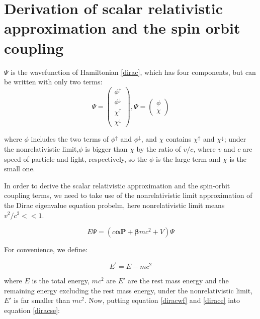 \documentclass[a4paper]{report}
\begin{document}
\section{Derivation of scalar relativistic approximation and the spin orbit coupling}

\noindent  $\Psi$ is the wavefunction of Hamiltonian \ref{dirac}, which has four components, but can be 
written with only two terms:
\begin{equation}\label{diracwf}
\Psi= \left( \begin{array}{c}
\phi^{\uparrow} \\
\phi^{\downarrow} \\
\chi^{\uparrow} \\
\chi^{\downarrow} \end{array} \right),
 \Psi = \left(\begin{array}{c}
\phi \\               
\chi \end{array} \right)
\end{equation}


\noindent where $\phi$ includes the two terms of $\phi^{\uparrow}$ and $\phi^{\downarrow}$, and $\chi$ contains  $\chi^{\uparrow}$ and $\chi^{\downarrow}$;
under the nonrelativistic limit,$\phi$ is bigger than $\chi$ by the ratio of $v/c$, where $v$ and $c$ are speed of particle and light, respectively,
so the $\phi$ is the large term and $\chi$ is the small one.

\noindent In order to derive the scalar relativistic approximation and the spin-orbit coupling terms, we need to take use of the nonrelativistic limit approximation of the 
Dirac eigenvalue equation probelm, here nonrelativistic limit means $v^2/c^2 << 1$.

\begin{equation}\label{diracse}
 E \Psi = (c \boldsymbol{\alpha} \textbf{P} + \boldsymbol{\beta}mc^{2} + V) \Psi
\end{equation}

\noindent For convenience, we define:

\begin{equation}\label{dirace}
E^{\prime} = E - mc^2
\end{equation}

\noindent where $E$ is the total energy, $mc^2$ are $E'$ are the rest mass energy and the remaining energy excluding the rest mass energy, under the nonrelativistic limit, 
$E'$ is far smaller than $mc^2$. Now, putting equation \ref{diracwf} and \ref{dirace} into equation \ref{diracse}:
\end{document}
